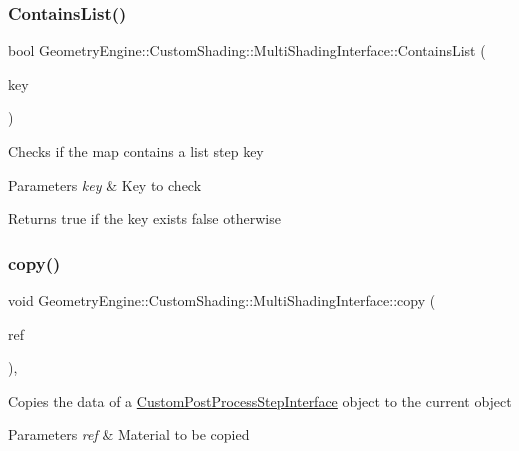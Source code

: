 \subsubsection{\texorpdfstring{ContainsList()}{ContainsList()}}
{\footnotesize\ttfamily bool Geometry\+Engine\+::\+Custom\+Shading\+::\+Multi\+Shading\+Interface\+::\+Contains\+List (\begin{DoxyParamCaption}\item[{\mbox{\hyperlink{namespace_geometry_engine_1_1_custom_shading_a9bfcbfb6d734e4d6fb8e2c661b987db6}{Shading\+Lists}}}]{key }\end{DoxyParamCaption})\hspace{0.3cm}{\ttfamily [inline]}}

Checks if the map contains a list step key 
\begin{DoxyParams}{Parameters}
{\em key} & Key to check \\
\hline
\end{DoxyParams}
\begin{DoxyReturn}{Returns}
true if the key exists false otherwise 
\end{DoxyReturn}
\mbox{\label{class_geometry_engine_1_1_custom_shading_1_1_multi_shading_interface_aa2346483f10349ed95ff036013cc866b}} 
\subsubsection{\texorpdfstring{copy()}{copy()}}
{\footnotesize\ttfamily void Geometry\+Engine\+::\+Custom\+Shading\+::\+Multi\+Shading\+Interface\+::copy (\begin{DoxyParamCaption}\item[{const \mbox{\hyperlink{class_geometry_engine_1_1_custom_shading_1_1_multi_shading_interface}{Multi\+Shading\+Interface}} \&}]{ref }\end{DoxyParamCaption})\hspace{0.3cm}{\ttfamily [protected]}, {\ttfamily [virtual]}}

Copies the data of a \mbox{\hyperlink{class_geometry_engine_1_1_custom_shading_1_1_custom_post_process_step_interface}{Custom\+Post\+Process\+Step\+Interface}} object to the current object 
\begin{DoxyParams}{Parameters}
{\em ref} & Material to be copied \\
\hline
\end{DoxyParams}
\mbox{\label{class_geometry_engine_1_1_custom_shading_1_1_multi_shading_interface_a37238d79bf72705b03e46899c6e4cf2f}} 
